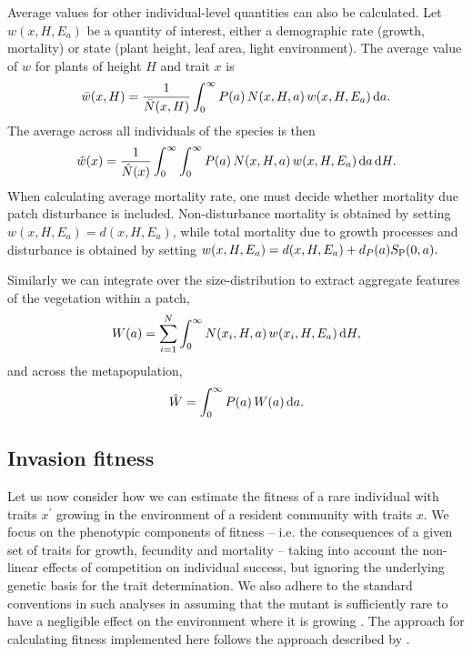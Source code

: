 \documentclass[10pt,twoside]{article}
\begin{document}
Average values for other individual-level quantities can also be calculated.
Let
\(w(x, H, E_a)\) be a quantity of interest, either a demographic rate
(growth, mortality) or state (plant height, leaf area, light environment).
The average value of \(w\) for plants of height $H$ and trait $x$ is
\begin{equation}\bar{w}(x, H) = \frac1{\bar{N}(x, H)}\int_{0}^{\infty}P(a) \, N(x, H, a) \, w(x, H, E_a) \, {\rm d}a.
\end{equation}
The average across all individuals of the species is then
\begin{equation}
  \hat{w}(x) = \frac1{\hat{N}(x) }\int_{0}^{\infty} \int_{0}^{\infty}P(a) \, N(x, H, a) \, w(x, H, E_a) \, {\rm d}a \, {\rm d}H.
\end{equation}
When calculating average mortality rate, one must decide whether
mortality due patch disturbance is included. Non-disturbance mortality
is obtained by setting \(w(x, H, E_a) = d(x, H, E_a)\), while total
mortality due to growth processes and disturbance is obtained by setting
\(w(x, H, E_a) = d(x, H, E_a) + d_P(a) S_{\rm P}(0, a).\)

Similarly we can integrate over the size-distribution to extract aggregate
features of the vegetation within a patch,
\begin{equation}
  W(a) = \sum_{i = 1}^{N} \int_{0}^{\infty} N(x_i, H, a) \, w(x_i, H, E_a) \, {\rm d}H,
\end{equation}
and across the metapopulation,
\begin{equation}
  \hat{W} = \int_{0}^{\infty} P(a) \, W(a) \, {\rm d}a.
\end{equation}

\subsection{Invasion fitness}\label{invasion-fitness}

Let us now consider how we can estimate the fitness of a rare individual
with traits \(x^\prime\) growing in the environment of a resident
community with traits \(x\). We focus on the phenotypic components
of fitness -- i.e. the consequences of a given set of traits for growth,
fecundity and mortality -- taking into account the non-linear effects of
competition on individual success, but ignoring the underlying genetic
basis for the trait determination. We also adhere to the standard
conventions in such analyses in assuming that the mutant is sufficiently
rare to have a negligible effect on the environment where it is growing \citep{Geitz-1998}.
The approach for calculating fitness implemented here follows the approach
described by \citep{Falster-2015}.
\end{document}
